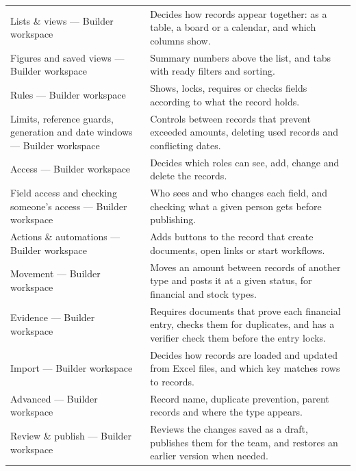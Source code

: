 \begin{table}[H]
\begin{tabularx}{\linewidth}{R{4.2cm} Y}
Lists \& views — Builder workspace & Decides how records appear together: as a table, a board or a calendar, and which columns show.\\
Figures and saved views — Builder workspace & Summary numbers above the list, and tabs with ready filters and sorting.\\
Rules — Builder workspace & Shows, locks, requires or checks fields according to what the record holds.\\
Limits, reference guards, generation and date windows — Builder workspace & Controls between records that prevent exceeded amounts, deleting used records and conflicting dates.\\
Access — Builder workspace & Decides which roles can see, add, change and delete the records.\\
Field access and checking someone's access — Builder workspace & Who sees and who changes each field, and checking what a given person gets before publishing.\\
Actions \& automations — Builder workspace & Adds buttons to the record that create documents, open links or start workflows.\\
Movement — Builder workspace & Moves an amount between records of another type and posts it at a given status, for financial and stock types.\\
Evidence — Builder workspace & Requires documents that prove each financial entry, checks them for duplicates, and has a verifier check them before the entry locks.\\
Import — Builder workspace & Decides how records are loaded and updated from Excel files, and which key matches rows to records.\\
Advanced — Builder workspace & Record name, duplicate prevention, parent records and where the type appears.\\
Review \& publish — Builder workspace & Reviews the changes saved as a draft, publishes them for the team, and restores an earlier version when needed.\\
\end{tabularx}
\end{table}
